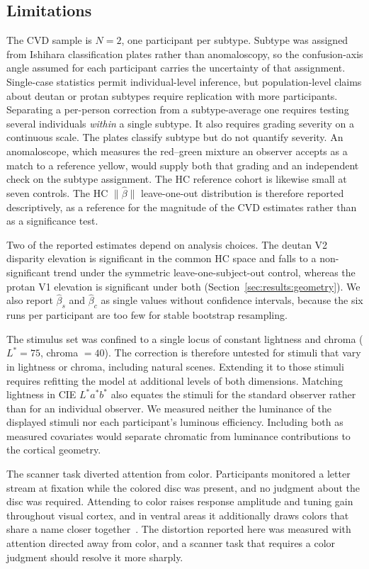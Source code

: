 \subsection{Limitations}
The CVD sample is $N = 2$, one participant per subtype. Subtype was assigned from Ishihara classification plates rather than anomaloscopy, so the confusion-axis angle assumed for each participant carries the uncertainty of that assignment. Single-case statistics \parencite{crawford1998} permit individual-level inference, but population-level claims about deutan or protan subtypes require replication with more participants. Separating a per-person correction from a subtype-average one requires testing several individuals \emph{within} a single subtype. It also requires grading severity on a continuous scale. The plates classify subtype but do not quantify severity. An anomaloscope, which measures the red--green mixture an observer accepts as a match to a reference yellow, would supply both that grading and an independent check on the subtype assignment. The HC reference cohort is likewise small at seven controls. The HC $\|\hat\beta\|$ leave-one-out distribution is therefore reported descriptively, as a reference for the magnitude of the CVD estimates rather than as a significance test.

Two of the reported estimates depend on analysis choices. The deutan V2 disparity elevation is significant in the common HC space and falls to a non-significant trend under the symmetric leave-one-subject-out control, whereas the protan V1 elevation is significant under both (Section~\ref{sec:results:geometry}). We also report $\hat\beta_s$ and $\hat\beta_c$ as single values without confidence intervals, because the six runs per participant are too few for stable bootstrap resampling.

The stimulus set was confined to a single locus of constant lightness and chroma ($L^{*} = 75$, chroma $= 40$). The correction is therefore untested for stimuli that vary in lightness or chroma, including natural scenes. Extending it to those stimuli requires refitting the model at additional levels of both dimensions. Matching lightness in CIE $L^{*}a^{*}b^{*}$ also equates the stimuli for the standard observer rather than for an individual observer. We measured neither the luminance of the displayed stimuli nor each participant's luminous efficiency. Including both as measured covariates would separate chromatic from luminance contributions to the cortical geometry.

The scanner task diverted attention from color. Participants monitored a letter stream at fixation while the colored disc was present, and no judgment about the disc was required. Attending to color raises response amplitude and tuning gain throughout visual cortex, and in ventral areas it additionally draws colors that share a name closer together~\citep{brouwer2013}. The distortion reported here was measured with attention directed away from color, and a scanner task that requires a color judgment should resolve it more sharply.

